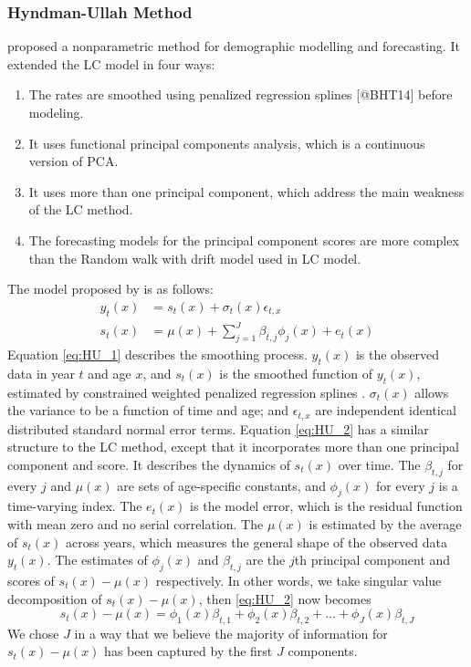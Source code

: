 \documentclass[11pt,a4paper,]{article}
\begin{document}
\hypertarget{hyndman-ullah-method}{%
\subsubsection{\texorpdfstring{Hyndman-Ullah Method \label{sec:HU}}{Hyndman-Ullah Method }}\label{hyndman-ullah-method}}

\textcite{HU07} proposed a nonparametric method for demographic modelling and forecasting. It extended the LC model in four ways:

\begin{enumerate}
\item The rates are smoothed using penalized regression splines [@BHT14] before modeling.
\item It uses functional principal components analysis, which is a continuous version of PCA.
\item It uses more than one principal component, which address the main weakness of the LC method.
\item The forecasting models for the principal component scores are more complex than the Random walk with drift model used in LC model.
\end{enumerate}

The model proposed by \textcite{HU07} is as follows:
\vspace{-.3in}
\begin{align}
  y_t(x) & = s_t(x) + \sigma_t(x)\epsilon_{t,x}\label{eq:HU_1}\\
  s_t(x) & = \mu(x) + \sum_{j=1}^{J}\beta_{t,j}\phi_j(x) + e_t(x)\label{eq:HU_2}
\end{align}
Equation \eqref{eq:HU_1} describes the smoothing process. \(y_t(x)\) is the observed data in year \(t\) and age \(x\), and \(s_t(x)\) is the smoothed function of \(y_t(x)\), estimated by constrained weighted penalized regression splines \autocite{BHT14}. \(\sigma_t(x)\) allows the variance to be a function of time and age; and \(\epsilon_{t,x}\) are independent identical distributed standard normal error terms. Equation \eqref{eq:HU_2} has a similar structure to the LC method, except that it incorporates more than one principal component and score. It describes the dynamics of \(s_t(x)\) over time. The \(\beta_{t,j}\) for every \(j\) and \(\mu(x)\) are sets of age-specific constants, and \(\phi_j(x)\) for every \(j\) is a time-varying index. The \(e_t(x)\) is the model error, which is the residual function with mean zero and no serial correlation. The \(\mu(x)\) is estimated by the average of \(s_t(x)\) across years, which measures the general shape of the observed data \(y_t(x)\). The estimates of \(\phi_j(x)\) and \(\beta_{t,j}\) are the \(j\)th principal component and scores of \(s_t(x)-\mu(x)\) respectively. In other words, we take singular value decomposition of \(s_t(x)-\mu(x)\), then \eqref{eq:HU_2} now becomes
\vspace{-.2in}
\begin{equation*}
  s_t(x)-\mu(x) = \phi_1(x)\beta_{t,1}+\phi_2(x)\beta_{t,2}+\dots+\phi_J(x)\beta_{t,J}
\end{equation*}
We chose \(J\) in a way that we believe the majority of information for \(s_t(x)-\mu(x)\) has been captured by the first \(J\) components.
\end{document}
